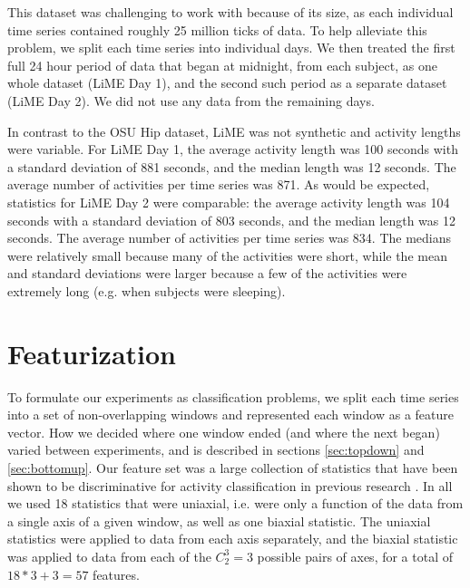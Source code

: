 
This dataset was challenging to work with because of its size, as each individual time series
contained roughly 25 million ticks of data. To help alleviate this problem, we split each
time series into individual days. We then treated the first full 24 hour period of data that began at midnight,
from each subject, as one whole dataset (LiME Day 1), and the second such period as a separate dataset
(LiME Day 2). We did not use any data from the remaining days.

In contrast to the OSU Hip dataset, LiME
was not synthetic and activity lengths were variable. For LiME Day 1, the
average activity length was 100 seconds with a standard deviation of 881 seconds, and the
median length was 12 seconds. The average number of activities per time series was
871. As would be expected, statistics for LiME Day 2 were comparable: the
average activity length was 104 seconds with a standard deviation of 803 seconds, and the
median length was 12 seconds. The average number of activities per time series was 834.
The medians were relatively small because many of the activities were short,
while the mean and standard deviations were larger because a few of the
activities were extremely long (e.g. when subjects were sleeping).

\section{Featurization}
To formulate our experiments as classification problems, we split each time series into a set of
non-overlapping windows and represented each window as a feature vector.
How we decided where one window ended (and where the next began) varied between
experiments, and is described in sections \ref{sec:topdown} and \ref{sec:bottomup}. Our feature
set was a large collection of statistics that have been shown to be discriminative
for activity classification in previous research \cite{li09} \cite{rothney07}
\cite{staudenmeyer09} \cite{zheng12}. In all we used 18 statistics that were
uniaxial, i.e. were only a function of the data from a single axis of a given window,
as well as one biaxial statistic.
The uniaxial statistics were applied to data from each axis separately, and
the biaxial statistic was applied to data from each of the $C_2^3=3$ possible pairs of
axes, for a total of $18*3+3 = 57$ features.

